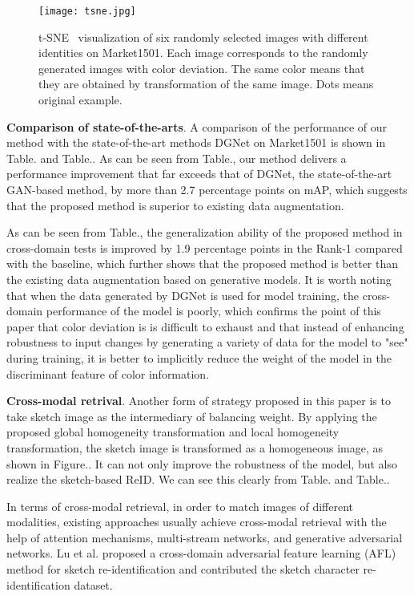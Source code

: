 \documentclass[10pt,twocolumn,letterpaper]{article}
\begin{document}
\begin{figure}[]
	\setlength{\abovecaptionskip}{0.1cm}
	\setlength{\belowcaptionskip}{-0.4cm}   \centering
	\texttt{[image: tsne.jpg]}
	\caption{t-SNE~\cite{tsne} visualization of six randomly selected images with different identities on Market1501\cite{market1501}. Each image corresponds to the randomly generated images with color deviation. The same color means that they are obtained by transformation of the same image. Dots means original example.}
\end{figure}


\textbf{Comparison of state-of-the-arts}. A comparison of the performance of our method with the state-of-the-art methods DGNet\cite{zheng2019joint} on Market1501\cite{market1501} is shown in Table. and Table.. As can be seen from Table., our method delivers a performance improvement that far exceeds that of DGNet, the state-of-the-art GAN-based method, by more than 2.7 percentage points on mAP, which suggests that the proposed method is superior to existing data augmentation. 

As can be seen from Table., the generalization ability of the proposed method in cross-domain tests is improved by 1.9 percentage points in the Rank-1 compared with the baseline\cite{zheng2018discriminatively}, which further shows that the proposed method is better than the existing data augmentation based on generative models. It is worth noting that when the data generated by DGNet is used for model training, the cross-domain performance of the model is poorly, which confirms the point of this paper that color deviation is is difficult to exhaust and that instead of enhancing robustness to input changes by generating a variety of data for the model to "see" during training, it is better to implicitly reduce the weight of the model in the discriminant feature of color information.

\textbf{Cross-modal retrival}. Another form of strategy proposed in this paper is to take sketch image as the intermediary of balancing weight. By applying the proposed global homogeneity transformation and local homogeneity transformation, the sketch image is transformed as a homogeneous image, as shown in Figure.. It can not only improve the robustness of the model, but also realize the sketch-based ReID. We can see this clearly from Table. and Table..

In terms of cross-modal retrieval\cite{song2017deep,sketch-criminal,basaran2020efficient}, in order to match images of different modalities, existing approaches usually achieve cross-modal retrieval with the help of attention mechanisms\cite{song2017deep}, multi-stream networks\cite{basaran2020efficient}, and generative adversarial networks\cite{sketch-criminal}. Lu et al. proposed a cross-domain adversarial feature learning (AFL) method for sketch re-identification and contributed the sketch character re-identification dataset\cite{sketch-criminal}.
\end{document}
